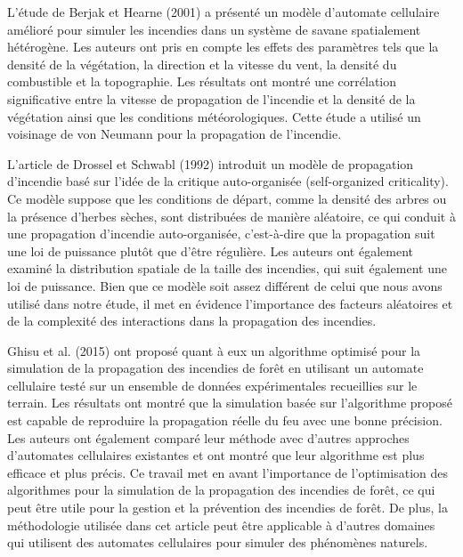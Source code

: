 L'étude de Berjak et Hearne (2001) \parencite{berjak2001} a présenté un modèle d'automate cellulaire amélioré pour simuler les incendies dans un système de savane spatialement hétérogène. Les auteurs ont pris en compte les effets des paramètres tels que la densité de la végétation, la direction et la vitesse du vent, la densité du combustible et la topographie. Les résultats ont montré une corrélation significative entre la vitesse de propagation de l'incendie et la densité de la végétation ainsi que les conditions météorologiques. Cette étude a utilisé un voisinage de von Neumann pour la propagation de l'incendie.

L'article de Drossel et Schwabl (1992) \parencite{drossel1992} introduit un modèle de propagation d'incendie basé sur l'idée de la critique auto-organisée (self-organized criticality). Ce modèle suppose que les conditions de départ, comme la densité des arbres ou la présence d'herbes sèches, sont distribuées de manière aléatoire, ce qui conduit à une propagation d'incendie auto-organisée, c'est-à-dire que la propagation suit une loi de puissance plutôt que d'être régulière. Les auteurs ont également examiné la distribution spatiale de la taille des incendies, qui suit également une loi de puissance. Bien que ce modèle soit assez différent de celui que nous avons utilisé dans notre étude, il met en évidence l'importance des facteurs aléatoires et de la complexité des interactions dans la propagation des incendies.

Ghisu et al. (2015) \parencite{ghisu2015} ont proposé quant à eux un algorithme optimisé pour la simulation de la propagation des incendies de forêt en utilisant un automate cellulaire testé sur un ensemble de données expérimentales recueillies sur le terrain. Les résultats ont montré que la simulation basée sur l'algorithme proposé est capable de reproduire la propagation réelle du feu avec une bonne précision. Les auteurs ont également comparé leur méthode avec d'autres approches d'automates cellulaires existantes et ont montré que leur algorithme est plus efficace et plus précis. Ce travail met en avant l'importance de l'optimisation des algorithmes pour la simulation de la propagation des incendies de forêt, ce qui peut être utile pour la gestion et la prévention des incendies de forêt. De plus, la méthodologie utilisée dans cet article peut être applicable à d'autres domaines qui utilisent des automates cellulaires pour simuler des phénomènes naturels.


